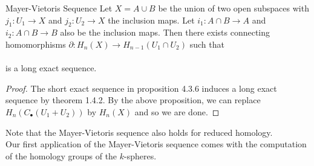 \documentclass[a4paper]{article}
\begin{document}
\begin{thm}{Mayer-Vietoris Sequence}{} Let $X=A\cup B$ be the union of two open subspaces with $j_1:U_1\to X$ and $j_2:U_2\to X$ the inclusion maps. Let $i_1:A\cap B\to A$ and $i_2:A\cap B\to B$ also be the inclusion maps. Then there exists connecting homomorphisms $\partial:H_n(X)\to H_{n-1}(U_1\cap U_2)$ such that \\
\\
is a long exact sequence. 
\begin{proof}
The short exact sequence in proposition 4.3.6 induces a long exact sequence by theorem 1.4.2. By the above proposition, we can replace $H_n(C_\bullet(U_1+U_2))$ by $H_n(X)$ and so we are done. 
\end{proof}
\end{thm}

Note that the Mayer-Vietoris sequence also holds for reduced homology. \\

Our first application of the Mayer-Vietoris sequence comes with the computation of the homology groups of the $k$-spheres. 
\end{document}
